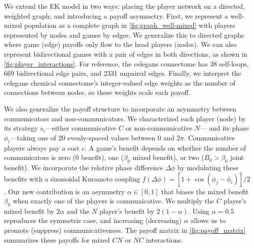 \documentclass[pdflatex,lineno,referee,sn-nature]{sn-jnl}
\begin{document}
We extend the EK model in two ways:
placing the player network on a directed, weighted graph;
and introducing a payoff asymmetry.
First, we represent a well-mixed population
as a complete graph in \cref{fig:graph_well-mixed}
with players represented by nodes and games by edges.
We generalize this to directed graphs
where game (edge) payoffs only flow to the head players (nodes).
We can also represent bidirectional games with
a pair of edges in both directions,
as shown in \cref{fig:player_interactions}.
For reference, the \gls{celegans} connectome
has \num{38} self-loops, \num{669} bidirectional edge pairs,
and \num{2331} unpaired edges.
Finally, we interpret the \gls{celegans} chemical connectome's
integer-valued edge weights
as the number of connections between nodes,
so these weights scale each payoff.

We also generalize the payoff structure to incorporate
an asymmetry between communicators and non-communicators.
We characterized each player (node) by its
strategy $s_i$---either communicative $C$ or non-communicative $N$---
and its phase $\phi_i$---taking one of \num{20} evenly-spaced values
between $0$ and $2 \pi$.
Communicative players always pay a cost $c$.
A game's benefit depends on whether the number of communicators is
zero (\num{0} benefit), one ($\beta_0$ mixed benefit),
or two ($B_0 > \beta_0$ joint benefit).
We incorporate the relative phase difference $\Delta \phi$
by modulating these benefits with a sinusoidal Kuramoto coupling
$f(\Delta \phi) = [1+\cos(\phi_j - \phi_i)]/2$.
Our new contribution is an asymmetry $\alpha \in [0,1]$
that biases the mixed benefit $\beta_0$ when exactly one of the players is communicative.
We multiply the $C$ player's mixed benefit by $2\alpha$
and the $N$ player's benefit by $2(1 - \alpha)$.
Using $\alpha = 0.5$ reproduces the symmetric case,
and increasing (decreasing) $\alpha$ allows us
to promote (suppress) communicativeness.
The payoff matrix in \cref{fig:payoff_matrix} summarizes these payoffs
for mixed $CN$ or $NC$ interactions.
\end{document}
